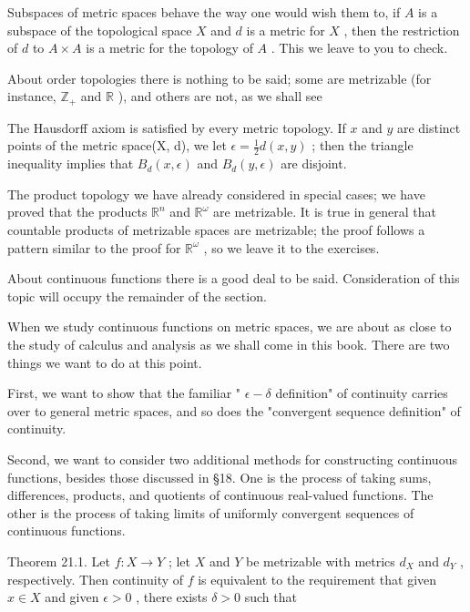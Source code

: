 Subspaces of metric spaces behave the way one would wish them to, if \(A\) is a subspace of the topological space \(X\) and \(d\) is a metric for \(X\) , then the restriction of \(d\) to \(A \times  A\) is a metric for the topology of \(A\) . This we leave to you to check.

About order topologies there is nothing to be said; some are metrizable (for instance, \({\mathbb{Z}}_{ + }\) and \(\mathbb{R}\) ), and others are not, as we shall see

The Hausdorff axiom is satisfied by every metric topology. If \(x\) and \(y\) are distinct points of the metric space(X, d), we let \(\epsilon  = \frac{1}{2}d\left( {x,y}\right)\) ; then the triangle inequality implies that \({B}_{d}\left( {x,\epsilon }\right)\) and \({B}_{d}\left( {y,\epsilon }\right)\) are disjoint.

The product topology we have already considered in special cases; we have proved that the products \({\mathbb{R}}^{n}\) and \({\mathbb{R}}^{\omega }\) are metrizable. It is true in general that countable products of metrizable spaces are metrizable; the proof follows a pattern similar to the proof for \({\mathbb{R}}^{\omega }\) , so we leave it to the exercises.

About continuous functions there is a good deal to be said. Consideration of this topic will occupy the remainder of the section.

When we study continuous functions on metric spaces, we are about as close to the study of calculus and analysis as we shall come in this book. There are two things we want to do at this point.

First, we want to show that the familiar " \(\epsilon  - \delta\) definition" of continuity carries over to general metric spaces, and so does the "convergent sequence definition" of continuity.

Second, we want to consider two additional methods for constructing continuous functions, besides those discussed in §18. One is the process of taking sums, differences, products, and quotients of continuous real-valued functions. The other is the process of taking limits of uniformly convergent sequences of continuous functions.

Theorem 21.1. Let \(f : X \rightarrow  Y\) ; let \(X\) and \(Y\) be metrizable with metrics \({d}_{X}\) and \({d}_{Y}\) , respectively. Then continuity of \(f\) is equivalent to the requirement that given \(x \in  X\) and given \(\epsilon  > 0\) , there exists \(\delta  > 0\) such that


